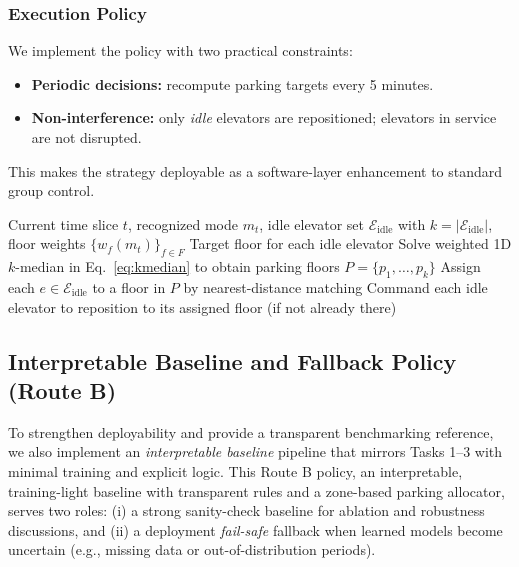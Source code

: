 \subsubsection{Execution Policy}
We implement the policy with two practical constraints:
\begin{itemize}
    \item \textbf{Periodic decisions:} recompute parking targets every 5 minutes.
    \item \textbf{Non-interference:} only \emph{idle} elevators are repositioned; elevators in service are not disrupted.
\end{itemize}
This makes the strategy deployable as a software-layer enhancement to standard group control.

\begin{algorithm}[htbp]
\caption{Mode-Aware Dynamic Parking Policy}
\label{alg:dynamic-parking}
\begin{algorithmic}[1]
\Require Current time slice $t$, recognized mode $m_t$, idle elevator set $\mathcal{E}_{\text{idle}}$ with $k=|\mathcal{E}_{\text{idle}}|$, floor weights $\{w_f(m_t)\}_{f\in F}$
\Ensure Target floor for each idle elevator
\State Solve weighted 1D $k$-median in Eq.~\eqref{eq:kmedian} to obtain parking floors $P=\{p_1,\dots,p_k\}$
\State Assign each $e\in \mathcal{E}_{\text{idle}}$ to a floor in $P$ by nearest-distance matching
\State Command each idle elevator to reposition to its assigned floor (if not already there)
\end{algorithmic}
\end{algorithm}


\subsection{Interpretable Baseline and Fallback Policy (Route B)}\label{subsec:baseline-fallback}
To strengthen deployability and provide a transparent benchmarking reference, we also implement an \emph{interpretable baseline}
pipeline that mirrors Tasks 1--3 with minimal training and explicit logic. This Route B policy, an interpretable, training-light baseline with transparent rules and a zone-based parking allocator, serves two roles: (i) a strong
sanity-check baseline for ablation and robustness discussions, and (ii) a deployment \emph{fail-safe} fallback when learned models
become uncertain (e.g., missing data or out-of-distribution periods). 

